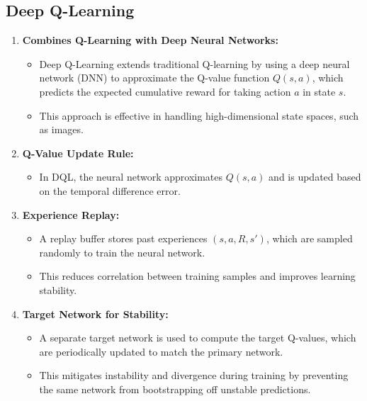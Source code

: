 \documentclass[12pt,a4paper]{article}
\begin{document}
\subsection{Deep Q-Learning}
\begin{enumerate}
    \item \textbf{Combines Q-Learning with Deep Neural Networks:}
    \begin{itemize}
        \item Deep Q-Learning extends traditional Q-learning by using a deep neural network (DNN) to approximate the Q-value function \( Q(s, a) \), which predicts the expected cumulative reward for taking action \( a \) in state \( s \).
        \item This approach is effective in handling high-dimensional state spaces, such as images.
    \end{itemize}

    \item \textbf{Q-Value Update Rule:}
    \begin{itemize}
        \item In DQL, the neural network approximates \( Q(s, a) \) and is updated based on the temporal difference error.
    \end{itemize}

    \item \textbf{Experience Replay:}
    \begin{itemize}
        \item A replay buffer stores past experiences \((s, a, R, s')\), which are sampled randomly to train the neural network.
        \item This reduces correlation between training samples and improves learning stability.
    \end{itemize}

    \item \textbf{Target Network for Stability:}
    \begin{itemize}
        \item A separate target network is used to compute the target Q-values, which are periodically updated to match the primary network.
        \item This mitigates instability and divergence during training by preventing the same network from bootstrapping off unstable predictions.
    \end{itemize}
\end{enumerate}
\end{document}

